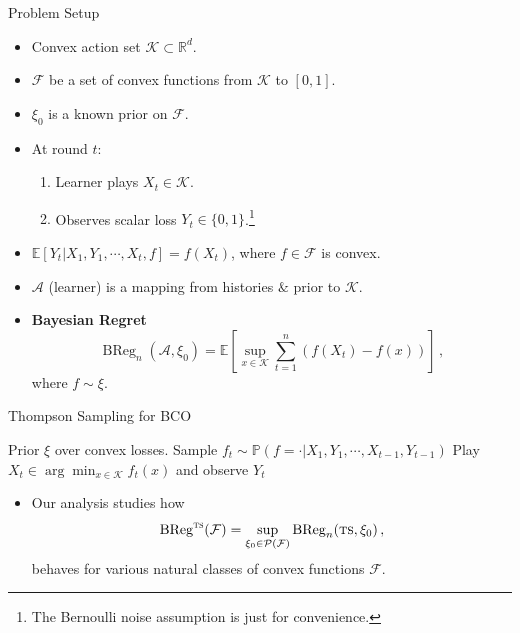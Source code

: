 \documentclass{beamer}
\newcommand{\BReg}{\operatorname{BReg}}
\newcommand{\E}{\mathbb{E}}
\newcommand{\PP}{\mathbb{P}}
\newcommand{\cK}{\mathcal{K}}
\newcommand{\cF}{\mathcal{F}}
\newcommand{\cA}{\mathcal{A}}
\newcommand{\cP}{\mathcal{P}}
\newcommand{\ts}{{\textsc{ts}}}
\begin{document}
\begin{frame}{Problem Setup}
    \begin{itemize}
        \item Convex action set \( \cK \subset \mathbb{R}^d \).
        \item $\cF$ be a set of convex functions from $\cK$ to $[0,1]$.
        \item $\xi_0$ is a known prior on $\cF$.
        \item<2-> At round \(t\):
              \begin{enumerate}
                  \item Learner plays \(X_t \in \cK\).
                  \item Observes scalar loss \( Y_t \in \{0,1\}\).\footnote{The Bernoulli noise assumption is just for convenience.}
              \end{enumerate}
        \item<3-> $\E\left[Y_t|X_1, Y_1, \cdots, X_t, f\right] = f(X_t)$, where $f \in \cF$ is convex.
        \item<4-> $\cA$ (learner) is a mapping from histories $\&$ prior to $\cK$.
        \item<5-> \textbf{Bayesian Regret}
              \[
                  \BReg_n(\cA, \xi_0) =
                  \E\left[
                      \sup_{x \in \cK}
                      \sum_{t=1}^n (f(X_t) - f(x))
                      \right]\,,
              \]
              where $f\sim \xi$.
    \end{itemize}
\end{frame}

\begin{frame}{Thompson Sampling for BCO}
    \begin{algorithm}[H]
        \caption{Thompson Sampling}
        \begin{algorithmic}[1]
            \State Prior \( \xi \) over convex losses.
            \State Sample \(f_t \sim \PP(f=\cdot|X_1, Y_1, \cdots, X_{t-1}, Y_{t-1})\)
            \State Play \( X_t \in \arg\min_{x\in\cK} f_t(x) \) and observe $Y_t$
            \EndFor
        \end{algorithmic}
    \end{algorithm}
    \begin{itemize}
        \item Our analysis studies how
              \[
                  \BReg^{\ts}(\cF) = \sup_{\xi_0 \in \cP(\cF)} \BReg_n(\ts, \xi_0)\,,
              \]
              behaves for various natural classes of convex functions $\cF$.
    \end{itemize}
\end{frame}
\end{document}
